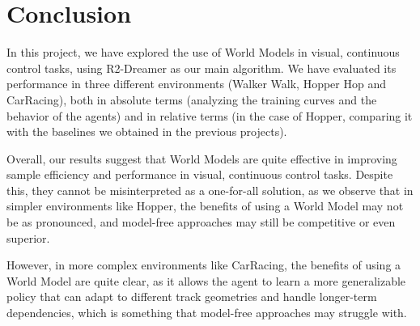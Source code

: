 \documentclass{article}
\begin{document}
\section{Conclusion}

In this project, we have explored the use of World Models in visual, continuous control tasks, using R2-Dreamer as our main algorithm. We have evaluated its performance in three different environments (Walker Walk, Hopper Hop and CarRacing), both in absolute terms (analyzing the training curves and the behavior of the agents) and in relative terms (in the case of Hopper, comparing it with the baselines we obtained in the previous projects).

Overall, our results suggest that World Models are quite effective in improving sample efficiency and performance in visual, continuous control tasks. Despite this, they cannot be misinterpreted as a one-for-all solution, as we observe that in simpler environments like Hopper, the benefits of using a World Model may not be as pronounced, and model-free approaches may still be competitive or even superior.

However, in more complex environments like CarRacing, the benefits of using a World Model are quite clear, as it allows the agent to learn a more generalizable policy that can adapt to different track geometries and handle longer-term dependencies, which is something that model-free approaches may struggle with.

\newpage



\end{document}
